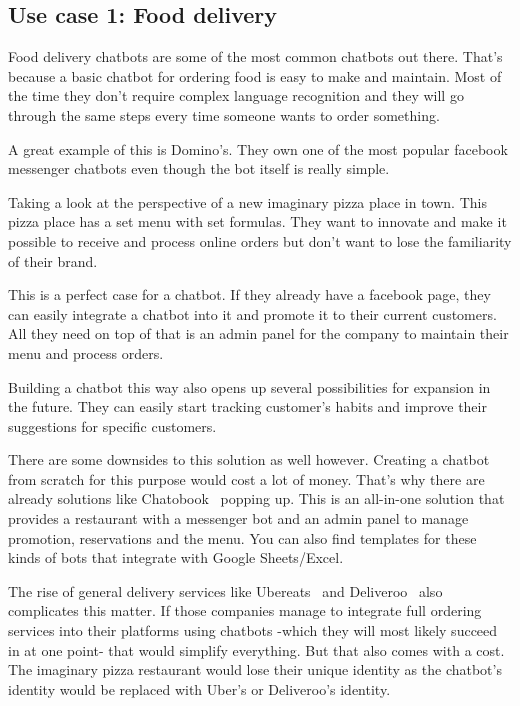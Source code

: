 \subsection{Use case 1: Food delivery}

Food delivery chatbots are some of the most common chatbots out there. That's because a basic chatbot for ordering food is easy to make and maintain. Most of the time they don't require complex language recognition and they will go through the same steps every time someone wants to order something.

A great example of this is Domino's. They own one of the most popular facebook messenger chatbots even though the bot itself is really simple.

Taking a look at the perspective of a new imaginary pizza place in town. This pizza place has a set menu with set formulas. They want to innovate and make it possible to receive and process online orders but don't want to lose the familiarity of their brand.

This is a perfect case for a chatbot. If they already have a facebook page, they can easily integrate a chatbot into it and promote it to their current customers. All they need on top of that is an admin panel for the company to maintain their menu and process orders.

Building a chatbot this way also opens up several possibilities for expansion in the future. They can easily start tracking customer's habits and improve their suggestions for specific customers.

There are some downsides to this solution as well however. Creating a chatbot from scratch for this purpose would cost a lot of money. That's why there are already solutions like Chatobook~\cite{chatobook} popping up. This is an all-in-one solution that provides a restaurant with a messenger bot and an admin panel to manage promotion, reservations and the menu. You can also find templates for these kinds of bots that integrate with Google Sheets/Excel.~\cite{chatbot-templates-pizza}

The rise of general delivery services like Ubereats~\cite{ubereats} and Deliveroo~\cite{deliveroo} also complicates this matter. If those companies manage to integrate full ordering services into their platforms using chatbots -which they will most likely succeed in at one point- that would simplify everything. But that also comes with a cost. The imaginary pizza restaurant would lose their unique identity as the chatbot's identity would be replaced with Uber's or Deliveroo's identity.

